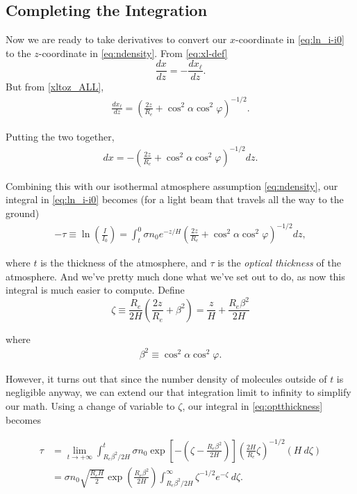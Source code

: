 \documentclass[10pt]{article}
\begin{document}
\subsection{Completing the Integration}
Now we are ready to take derivatives to convert our $x$-coordinate in \eqref{eq:ln_i-i0} to the $z$-coordinate in \eqref{eq:ndensity}. From \eqref{eq:xl-def}
$$
\frac{dx}{dz} = -\frac{dx_{\ell}}{dz}.
$$
But from \eqref{xltoz_ALL},
\begin{align}
\frac{dx_{\ell}}{dz} = \left(\frac{2z}{R_e} + \cos^2\alpha \cos^2\varphi \right)^{-1/2}.
\end{align}

Putting the two together,
\begin{align}
dx = -\left(\frac{2z}{R_e} + \cos^2\alpha \cos^2\varphi \right)^{-1/2} dz.
\end{align}

Combining this with our isothermal atmosphere assumption \eqref{eq:ndensity}, our integral in \eqref{eq:ln_i-i0} becomes (for a light beam that travels all the way to the ground)
\begin{align} \label{eq:optthickness}
-\tau \equiv \ln \left(\frac{I}{I_0}\right) = \int_{t}^0 \sigma n_0 e^{-z/H} \left(\frac{2z}{R_e} + \cos^2\alpha \cos^2\varphi \right)^{-1/2} dz,
\end{align}

where $t$ is the thickness of the atmosphere, and $\tau$ is the \textit{optical thickness} of the atmosphere. And we've pretty much done what we've set out to do, as now this integral is much easier to compute. Define
$$
\zeta \equiv \frac{R_e}{2H}\left(\frac{2z}{R_e} + \beta^2 \right) = \frac{z}{H} + \frac{R_e\beta^2}{2H}
$$

where
\begin{align} \label{eq:beta-def}
\beta^2 \equiv \cos^2 \alpha \cos^2 \varphi.
\end{align}

However, it turns out that since the number density of molecules outside of $t$ is negligible anyway, we can extend our that integration limit to infinity to simplify our math. Using a change of variable to $\zeta$, our integral in \eqref{eq:optthickness} becomes

\begin{align}
\tau &= \lim_{t \to +\infty} \int_{R_e \beta^2 / 2H}^{t} \sigma n_0 \exp\left[-\left(\zeta - \frac{R_e \beta^2}{2H}\right)\right] \left(\frac{2H}{R_e}\zeta\right)^{-1/2} (H \: d\zeta) \nonumber \\[0.4em] \label{eq:simplestint}
&= \sigma n_0 \sqrt{\frac{R_e H}{2}}\exp\left(\frac{R_e \beta^2}{2H}\right)\int_{R_e \beta^2 / 2H}^{\infty}  \zeta^{-1/2} e^{-\zeta} \: d\zeta. 
\end{align}
\end{document}
